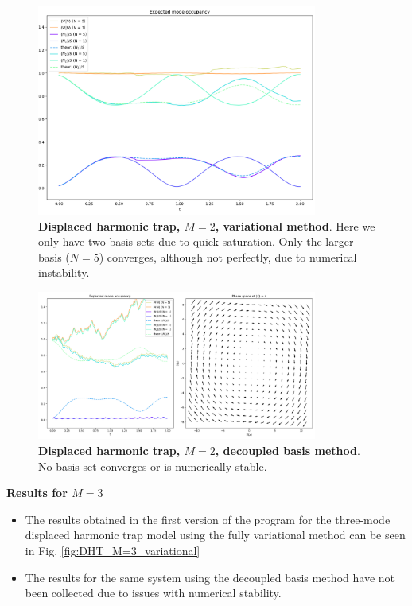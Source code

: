 \documentclass[12pt]{article}
\begin{document}
	\begin{figure}
	\begin{center}
	\vspace{-2cm}
	\includegraphics[width=0.82\textwidth]{images/DHT_M=2}
	\caption{\textbf{Displaced harmonic trap, $M=2$, variational method}. Here we only have two basis sets due to quick saturation. Only the larger basis ($N=5$) converges, although not perfectly, due to numerical instability.}\label{fig:DHT_M=2_variational}
	\end{center}
	\end{figure}
	
	\begin{figure}
	\begin{center}
	\includegraphics[width=0.82\textwidth]{images/DHT_M=2_uncoupled_basis}
	\caption{\textbf{Displaced harmonic trap, $M=2$, decoupled basis method}. No basis set converges or is numerically stable.}\label{fig:DHT_M=2_uncoupled}
	\end{center}
	\end{figure}
	
	\textbf{Results for $M=3$}
	\begin{itemize}
	\item The results obtained in the first version of the program for the three-mode displaced harmonic trap model using the fully variational method can be seen in Fig. \ref{fig:DHT_M=3_variational}
	\item The results for the same system using the decoupled basis method have not been collected due to issues with numerical stability.
	\end{itemize}
	
\end{document}
